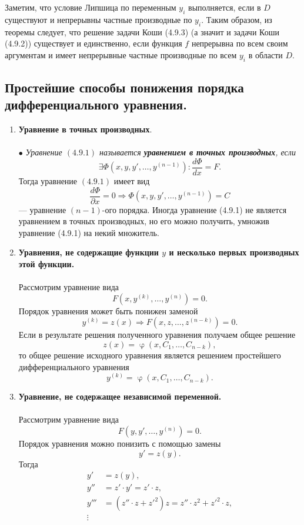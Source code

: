 \documentclass[a4paper, 12pt]{report}
\newcommand{\FI}{\Phi}
\renewcommand{\varphi}{\upvarphi}
\renewcommand{\d}{\partial}
\begin{document}
Заметим, что условие Липшица по переменным $y_i$ выполняется, если в $D$ существуют и непрерывны частные производные по $y_i$. Таким образом, из теоремы следует, что решение задачи Коши (4.9.3) (а значит и задачи Коши (4.9.2)) существует и единственно, если функция $f$ непрерывна по всем своим аргументам и имеет непрерывные частные производные по всем $y_i$ в области $D$.
\subsection{Простейшие способы понижения порядка дифференциального уравнения.}
\begin{enumerate}
	\item \textbf{Уравнение в точных производных}.\\\\
	$\bullet$ \textit{Уравнение $(4.9.1)$ называется \textbf{уравнением в точных производных}, если $$\exists \FI(x,y,y',\ldots, y^{(n-1)}) : \dfrac{d \FI}{d x} = F.$$}
	Тогда уравнение $(4.9.1)$ имеет вид $$\dfrac{d \FI}{\d x}= 0 \Rightarrow \FI(x,y,y', \ldots, y^{(n-1)}) = C$$
	--- уравнение $(n-1)$-ого порядка.
	Иногда уравнение (4.9.1) не является уравнением в точных производных, но его можно получить, умножив уравнение (4.9.1) на некий множитель.
	\item \textbf{Уравнения, не содержащие функции $y$ и несколько первых производных этой функции.}\\\\
	Рассмотрим уравнение вида $$F(x,y^{(k)}, \ldots, y^{(n)}) = 0.$$
	Порядок уравнения может быть понижен заменой $$y^{(k)} = z(x) \Rightarrow F(x, z, \ldots, z^{(n-k)}) = 0.$$
	Если в результате решения полученного уравнения получаем общее решение $$z(x) = \varphi(x, C_1, \ldots, C_{n-k}),$$
	 то общее решение исходного уравнения является решением простейшего дифференциального уравнения $$y^{(k)} = \varphi(x, C_1, \ldots, C_{n-k}).$$
	 \item \textbf{Уравнение, не содержащее независимой переменной.}\\\\Рассмотрим уравнение вида $$F(y,y',\ldots, y^{(n)}) = 0.$$
	 Порядок уравнения можно понизить с помощью замены $$y' = z(y).$$
	 Тогда  $$\begin{aligned}
	 	y' &= z(y),\\
	 	y'' &= z'\cdot y' = z'\cdot z,\\
	 	y''' &= (z''\cdot z + z'^2)z = z''\cdot z^2 + z'^2 \cdot z,\\
	 	\vdots
	 \end{aligned}$$

\end{enumerate}
\end{document}
